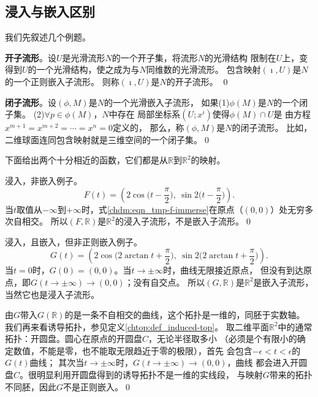 \subsection{浸入与嵌入区别}
我们先叙述几个例题。
\begin{example}\label{chdm:exm_opensub}
    \textbf{开子流形}。设$U$是光滑流形$N$的一个开子集，将流形$N$的光滑结构
    限制在$U$上，变得到$U$的一个光滑结构，使之成为与$N$同维数的光滑流形。
    包含映射$(\imath,U)$是$N$的一个正则嵌入子流形。
    则称$(\imath,U)$是$N$的开子流形。 \qed
\end{example}

\begin{example}\label{chdm:exm_closesub}
    \textbf{闭子流形}。设$(\phi,M)$是$N$的一个光滑嵌入子流形，
    如果(1)$\phi(M)$是$N$的一个闭子集。 (2)$\forall p\in \phi(M)$，$N$中存在
    局部坐标系$(U;x^i)$使得$\phi(M)\cap U$是
    由方程$x^{m+1}=x^{m+2}=\cdots=x^n=0$定义的，
    那么，称$(\phi,M)$是$N$的闭子流形。
    比如，二维球面连同包含映射就是三维空间的一个闭子集。\qed
\end{example}


下面给出两个十分相近的函数，它们都是从$\mathbb{R}$到$\mathbb{R}^2$的映射。
\begin{example}\label{chdm:exm_iec1}
    浸入，非嵌入例子。  
    \begin{equation}\label{chdm:eqn_tmp-f-immerse}
        F(t)=\left(2\cos\Big(t-\frac{\pi}{2}\Big),\ \sin2\Big(t-\frac{\pi}{2}\Big) \right) .
    \end{equation}
    当$t$取值从$-\infty$到$+\infty$时，式\eqref{chdm:eqn_tmp-f-immerse}在原点（$(0,0)$）处无穷多次自相交。
    所以$(F,\mathbb{R})$是$\mathbb{R}^2$的浸入子流形，不是嵌入子流形。\qed  
\end{example}

\begin{example}\label{chdm:exm_iec2}
    浸入，且嵌入，但非正则嵌入例子。
    \begin{equation}\label{chdm:eqn_tmp-g-embed}
      G(t)=\left(2\cos\Big(2\arctan t+\frac{\pi}{2}\Big),\ \sin2\Big(2 \arctan t+\frac{\pi}{2}\Big) \right) . 
    \end{equation}    
        当$t=0$时，$G(0)=(0,0)$。当$t\to \pm \infty$时，曲线无限接近原点，
    但没有到达原点，即$G(t\to \pm \infty)\to (0,0)$；没有自交点。
    所以$(G,\mathbb{R})$是$\mathbb{R}^2$是嵌入子流形，当然它也是浸入子流形。

    由$G$带入$G(\mathbb{R})$的是一条不自相交的曲线，这个拓扑是一维的，同胚于实数轴。
    我们再来看诱导拓扑，参见定义\ref{chtop:def_induced-top}。
    取二维平面$\mathbb{R}^2$中的通常拓扑：开圆盘。圆心在原点的开圆盘$C$，无论半径取多小
    （必须是个有限小的确定数值，不能是零，也不能取无限趋近于零的极限），首先
    会包含$-\epsilon < t< \epsilon$的$G(t)$曲线；
    其次当$t\to \pm \infty$时，$G(t\to \pm \infty)\to (0,0)$，曲线
    都会进入开圆盘$C$。很明显利用开圆盘得到的诱导拓扑不是一维的实线段，
    与映射$G$带来的拓扑不同胚，因此$G$不是正则嵌入。\qed
\end{example}



